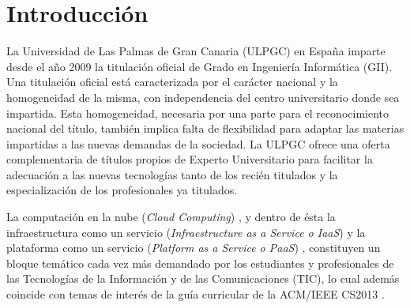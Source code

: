 \documentclass[conference]{IEEEtran}
\begin{document}

\section{Introducción}

La Universidad de Las Palmas de Gran Canaria (ULPGC) en España imparte desde el
año 2009 la titulación oficial de Grado en Ingeniería Informática (GII). Una
titulación oficial está caracterizada por el carácter nacional y la
homogeneidad de la misma, con independencia del centro universitario
donde sea impartida. Esta homogeneidad, necesaria por una parte
para el reconocimiento nacional del título, también implica falta de
flexibilidad para adaptar las materias impartidas a las nuevas demandas de la
sociedad. La ULPGC ofrece
una oferta complementaria de títulos propios de Experto Universitario para
facilitar la adecuación a las nuevas tecnologías tanto de los recién titulados
y la especialización de los
profesionales ya titulados.

La computación en la nube (\textit{Cloud Computing}) \cite{Buyya:2013}, y dentro
de ésta la
infraestructura como
un servicio (\textit{Infraestructure as a Service o IaaS})
y 
la plataforma como un servicio (\textit{Platform as a Service o PaaS})
\cite{Carlson:2013},
constituyen un bloque temático cada vez más demandado por los estudiantes y
profesionales de las Tecnologías de la Información y de las Comunicaciones
(TIC), lo cual además coincide con temas de interés de la guía curricular de la ACM/IEEE CS2013 \cite{acm:2013}.
\end{document}
